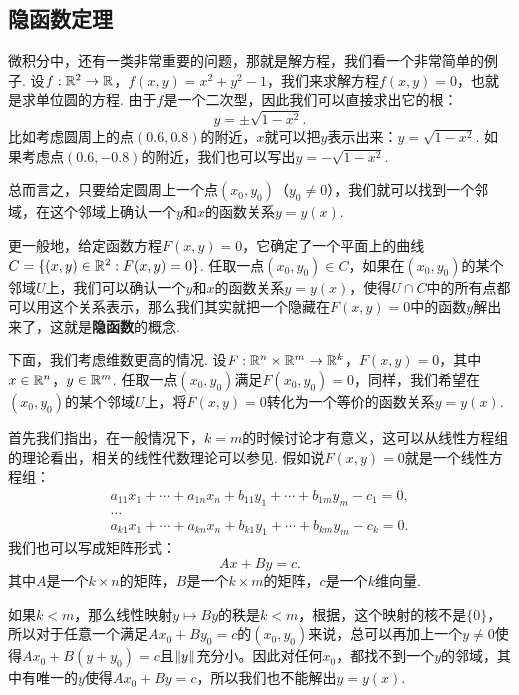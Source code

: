 \subsection{隐函数定理}

微积分中，还有一类非常重要的问题，那就是解方程，我们看一个非常简单的例子. 设$f:\mathbb{R}^2\to\mathbb{R}$，$f(x,y)=x^2+y^2-1$，我们来求解方程$f(x,y)=0$，也就是求单位圆的方程. 由于$f$是一个二次型，因此我们可以直接求出它的根：
    \[y=\pm\sqrt{1-x^2}.\]
比如考虑圆周上的点$(0.6,0.8)$的附近，$x$就可以把$y$表示出来：$y=\sqrt{1-x^2}$. 如果考虑点$(0.6,-0.8)$的附近，我们也可以写出$y=-\sqrt{1-x^2}$. 
    
总而言之，只要给定圆周上一个点$(x_0,y_0)$（$y_0\neq 0$），我们就可以找到一个邻域，在这个邻域上确认一个$y$和$x$的函数关系$y=y(x)$.

更一般地，给定函数方程$F(x,y)=0$，它确定了一个平面上的曲线$C=\{(x,y)\in\mathbb{R}^2:F(x,y)=0\}$. 任取一点$(x_0,y_0)\in C$，如果在$(x_0,y_0)$的某个邻域$U$上，我们可以确认一个$y$和$x$的函数关系$y=y(x)$，使得$U\cap C$中的所有点都可以用这个关系表示，那么我们其实就把一个隐藏在$F(x,y)=0$中的函数$y$解出来了，这就是\textbf{隐函数}的概念.

下面，我们考虑维数更高的情况. 设$F:\mathbb{R}^n\times\mathbb{R}^m\to\mathbb{R}^k$，$F(x,y)=0$，其中$x\in\mathbb{R}^n$，$y\in\mathbb{R}^m$. 任取一点$(x_0,y_0)$满足$F(x_0,y_0)=0$，同样，我们希望在$(x_0,y_0)$的某个邻域$U$上，将$F(x,y)=0$转化为一个等价的函数关系$y=y(x)$. 

首先我们指出，在一般情况下，$k=m$的时候讨论才有意义，这可以从线性方程组的理论看出，相关的线性代数理论可以参见. 假如说$F(x,y)=0$就是一个线性方程组：
\begin{equation}
    \begin{gathered}
        a_{11}x_1+\cdots+a_{1n}x_n+b_{11}y_1+\cdots+b_{1m}y_m-c_1=0, \\
        \dots \\
        a_{k1}x_1+\cdots+a_{kn}x_n+b_{k1}y_1+\cdots+b_{km}y_m-c_k=0.
    \end{gathered}
    \label{eq:linear-equation}
\end{equation}
我们也可以写成矩阵形式：
\[Ax+By=c.\]
其中$A$是一个$k\times n$的矩阵，$B$是一个$k\times m$的矩阵，$c$是一个$k$维向量.

如果$k<m$，那么线性映射$y\mapsto By$的秩是$k<m$，根据，这个映射的核不是$\{0\}$，所以对于任意一个满足$Ax_0+By_0=c$的$(x_0,y_0)$来说，总可以再加上一个$y\neq 0$使得$Ax_0+B(y+y_0)=c$且$\left\|y\right\|$充分小。因此对任何$x_0$，都找不到一个$y$的邻域，其中有唯一的$y$使得$Ax_0+By=c$，所以我们也不能解出$y=y(x)$.

